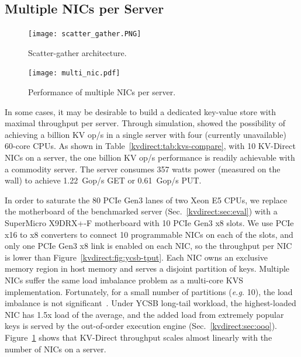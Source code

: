 \subsection{Multiple NICs per Server}
\label{kvdirect:sec:multi-nic}

\begin{figure}[t]
\begin{minipage}[t]{0.5\textwidth}
\centering
\texttt{[image: scatter\_gather.PNG]}
\caption{Scatter-gather architecture.}
\label{kvdirect:fig:sg-arch}
\end{minipage}
\begin{minipage}[t]{0.5\textwidth}
\centering
\texttt{[image: multi\_nic.pdf]}
\caption{Performance of multiple NICs per server.}
\label{kvdirect:fig:multiple-nics}
\end{minipage}

\end{figure}

In some cases, it may be desirable to build a dedicated key-value store with maximal throughput per server.
Through simulation, \cite{li2016full} showed the possibility of achieving a billion KV op/s in a single server with four (currently unavailable) 60-core CPUs.
As shown in Table~\ref{kvdirect:tab:kvs-compare}, with 10 KV-Direct NICs on a server, the one billion KV op/s performance is readily achievable with a commodity server.
The server consumes 357 watts power (measured on the wall) to achieve 1.22~Gop/s GET or 0.61~Gop/s PUT.

In order to saturate the 80 PCIe Gen3 lanes of two Xeon E5 CPUs, we replace the motherboard of the benchmarked server (Sec.~\ref{kvdirect:sec:eval}) with a SuperMicro X9DRX+-F motherboard with 10 PCIe Gen3 x8 slots.
We use PCIe x16 to x8 converters to connect 10 programmable NICs on each of the slots, and only one PCIe Gen3 x8 link is enabled on each NIC, so the throughput per NIC is lower than Figure~\ref{kvdirect:fig:ycsb-tput}.
Each NIC owns an exclusive memory region in host memory and serves a disjoint partition of keys.
Multiple NICs suffer the same load imbalance problem as a multi-core KVS implementation.
Fortunately, for a small number of partitions (\textit{e.g.} 10), the load imbalance is not significant~\cite{lim2014mica,li2016full}. Under YCSB long-tail workload, the highest-loaded NIC has 1.5x load of the average, and the added load from extremely popular keys is served by the out-of-order execution engine (Sec.~\ref{kvdirect:sec:ooo}).
Figure~\ref{kvdirect:fig:multiple-nics} shows that KV-Direct throughput scales almost linearly with the number of NICs on a server.

